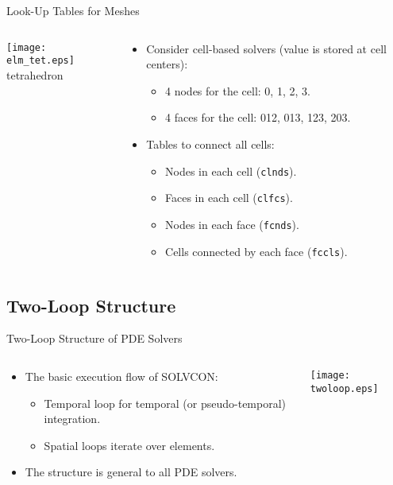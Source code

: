 \documentclass[dvips,xcolor=pst,14pt]{beamer}
\begin{document}
\begin{frame}{
%
Look-Up Tables for Meshes
%
}
\begin{columns}[c]
\begin{column}{.3\textwidth}
\begin{center}
  \texttt{[image: elm\_tet.eps]} \\ \footnotesize tetrahedron
\end{center}\end{column}
\begin{column}{.7\textwidth}
\begin{itemize}
  \item Consider cell-based solvers (value is stored at cell centers):
  \begin{itemize}
    \item 4 nodes for the cell: 0, 1, 2, 3.
    \item 4 faces for the cell: 012, 013, 123, 203.
  \end{itemize}
  \item Tables to connect all cells:
  \begin{itemize}
    \item Nodes in each cell (\texttt{clnds}).
    \item Faces in each cell (\texttt{clfcs}).
    \item Nodes in each face (\texttt{fcnds}).
    \item Cells connected by each face (\texttt{fccls}).
  \end{itemize}
\end{itemize}
\end{column}
\end{columns}
\end{frame}

\subsection{
Two-Loop Structure
}

\begin{frame}{
%
Two-Loop Structure of PDE Solvers
%
}
\begin{columns}[c]
\begin{column}{.5\textwidth}
\begin{itemize}
  \item The basic execution flow of SOLVCON:
  \begin{itemize}
    \item Temporal loop for temporal (or pseudo-temporal) integration.
    \item Spatial loops iterate over elements.
  \end{itemize}
  \item The structure is general to all PDE solvers.
\end{itemize}
\end{column}
\begin{column}{.5\textwidth}
  \texttt{[image: twoloop.eps]}
\end{column}
\end{columns}
\end{frame}
\end{document}
